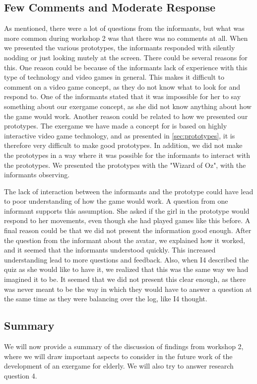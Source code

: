 \subsection{Few Comments and Moderate Response}
As mentioned, there were a lot of questions from the informants, but what was more common during workshop 2 was that there was no comments at all. When we presented the various prototypes, the informants responded with silently nodding or just looking mutely at the screen. There could be several reasons for this. One reason could be because of the informants lack of experience with this type of technology and video games in general. This makes it difficult to comment on a video game concept, as they do not know what to look for and respond to. One of the informants stated that it was impossible for her to say something about our exergame concept, as she did not know anything about how the game would work. Another reason could be related to how we presented our prototypes. The exergame we have made a concept for is based on highly interactive video game technology, and as presented in \ref{sec:prototypes}, it is therefore very difficult to make good prototypes. In addition, we did not make the prototypes in a way where it was possible for the informants to interact with the prototypes. We presented the prototypes with the "Wizard of Oz", with the informants observing. 

The lack of interaction between the informants and the prototype could have lead to poor understanding of how the game would work. A question from one informant supports this assumption. She asked if the girl in the prototype would respond to her movements, even though she had played games like this before. A final reason could be that we did not present the information good enough. After the question from the informant about the avatar, we explained how it worked, and it seemed that the informants understood quickly. This increased understanding lead to more questions and feedback. Also, when I4 described the quiz as she would like to have it, we realized that this was the same way we had imagined it to be. It seemed that we did not present this clear enough, as there was never meant to be the way in which they would have to answer a question at the same time as they were balancing over the log, like I4 thought.   

\subsection{Summary}
We will now provide a summary of the discussion of findings from workshop 2, where we will draw important aspects to consider in the future work of the development of an exergame for elderly. We will also try to answer research question 4.

